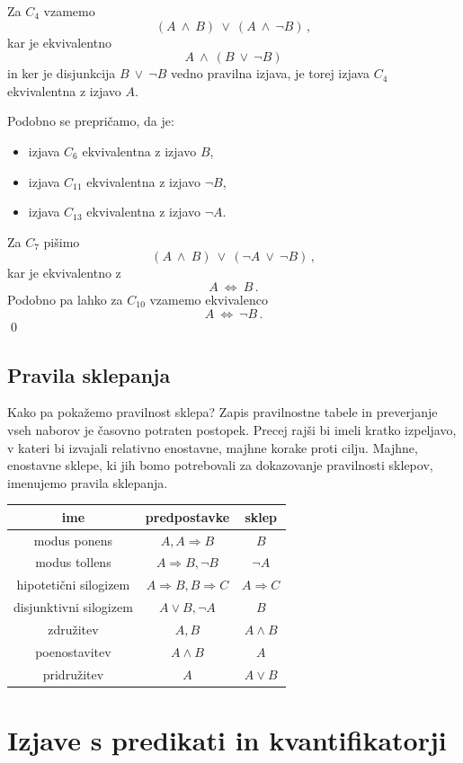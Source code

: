 \documentclass[11pt,paper=b5,footinclude,headinclude]{scrbook} %
\def\ali {{~\vee~}}
\def\inn {{~\wedge~}}
\def\cee {{~\Leftrightarrow~}}
\begin{document}
Za $C_4$ vzamemo $$(A\inn B) \ali (A\inn \neg B)\,,$$
kar je ekvivalentno
$$A\inn (B \ali \neg B)$$
in ker je disjunkcija $B \ali \neg B$ vedno pravilna izjava, je torej izjava $C_4$ ekvivalentna z izjavo $A$.

Podobno se prepričamo, da je:
\begin{itemize}
  \item  izjava $C_6$ ekvivalentna z izjavo $B$,
  \item  izjava $C_{11}$ ekvivalentna z izjavo $\neg B$,
  \item  izjava $C_{13}$ ekvivalentna z izjavo $\neg A$.
\end{itemize}
Za $C_7$ pišimo
$$(A\inn B) \ali (\neg A\ali \neg B)\,,$$
kar je ekvivalentno z
$$A\cee B\,.$$
Podobno pa lahko za $C_{10}$ vzamemo ekvivalenco
$$A\cee \neg B\,.$$
\qed
\subsection{Pravila sklepanja}
Kako pa pokažemo pravilnost sklepa? Zapis
pravilnostne tabele in preverjanje vseh naborov je časovno potraten postopek. Precej
rajši bi imeli kratko izpeljavo, v kateri bi izvajali relativno enostavne, majhne korake
proti cilju.
Majhne, enostavne sklepe, ki jih bomo potrebovali za dokazovanje pravilnosti sklepov,
imenujemo pravila sklepanja.

\begin{tabular}{|c|c|c|}
	\hline 
	ime & predpostavke & sklep\\
	\hline 
	\hline 
	modus ponens & $A,A\Rightarrow B$ & $B$\\
	\hline 
	modus tollens & $A\Rightarrow B,\neg B$ & $\neg A$\\
	\hline 
	hipoteti\v{c}ni silogizem & $A\Rightarrow B,B\Rightarrow C$ & $A\Rightarrow C$\\
	\hline 
	disjunktivni silogizem & $A\vee B,\neg A$ & $B$\\
	\hline 
	združitev  & $A,B$ & $A\wedge B$\\
	\hline 
	poenostavitev & $A\wedge B$ & $A$\\
	\hline 
	pridružitev & $A$ & $A\vee B$\\
	\hline 
\end{tabular}

{

\section{Izjave s predikati in kvantifikatorji}
}
\end{document}
